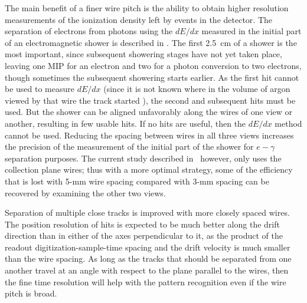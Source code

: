 The main benefit of a finer wire pitch is the ability to obtain higher resolution
measurements of the ionization density left by events in the detector.
The separation of electrons from photons using the $dE/dx$ measured in
the initial part of an electromagnetic shower is described in
\anxreco.  The first 2.5~cm of a shower is the most important, since %
subsequent showering stages have not yet taken place, leaving one MIP
for an electron and two for a photon conversion to two electrons,
though sometimes the subsequent showering starts earlier.  As the
first hit cannot be used to measure $dE/dx$ (since it is not known
where in the volume of argon viewed by that wire the track started ),
the second and subsequent hits must be used.  But the shower can be
aligned unfavorably along the wires of one view or another, resulting
in few usable hits.  If no hits are useful, then the $dE/dx$ method
cannot be used.  Reducing the spacing between wires in all three views
increases the precision of the measurement of the initial part of the
shower for $e-\gamma$ separation purposes.  The current study
described in \anxreco\, however, only uses the collection plane wires; %
thus with a more optimal strategy, some of the efficiency that is lost
with 5-mm wire spacing compared with 3-mm spacing can be recovered by
examining the other two views.

Separation of multiple close tracks is improved with more closely
spaced wires.  The position resolution of hits is expected to be much
better along the drift direction than in either of the axes
perpendicular to it, as the product of the readout digitization-sample-time spacing  
and the drift velocity is much smaller than the wire spacing.  As
long as the tracks %
that should be separated from one another
travel at %
an angle with respect to the plane parallel to the wires, 
then the fine time resolution will help with the pattern recognition
even if the wire pitch is broad.

